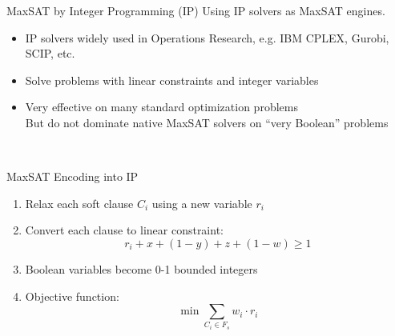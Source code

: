 \documentclass[t,english]{sdqbeamer}
\begin{document}
\begin{frame}{MaxSAT by Integer Programming (IP)}
\vspace{-2em}
Using IP solvers as MaxSAT engines.\\[1em]
\begin{itemize}\itemsep1em
	\item IP solvers widely used in Operations Research, e.g. IBM CPLEX, Gurobi, SCIP, etc.
	\item Solve problems with linear constraints and integer variables
	\item Very effective on many standard optimization problems\\[1ex]
	But do not dominate native MaxSAT solvers on ``very Boolean'' problems
\end{itemize}~\\
\begin{block}{MaxSAT Encoding into IP}
\begin{enumerate}
	\item Relax each soft clause $C_i$ using a new variable $r_i$
	\item Convert each clause to linear constraint:
	\[
	r_i + x + (1 - y) + z + (1 - w) \geq 1
	\]
	\item Boolean variables become 0-1 bounded integers
	\item Objective function:
	\[
	\min \sum_{C_i \in F_s} w_i \cdot r_i
	\]
\end{enumerate}
\end{block}
\end{frame}
\end{document}
